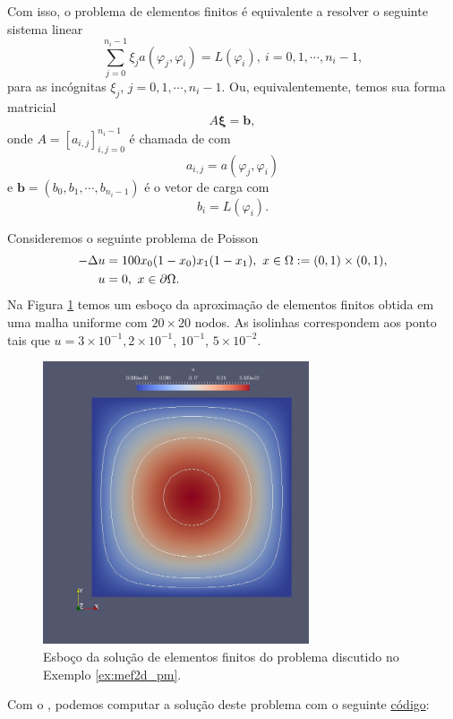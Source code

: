 Com isso, o problema de elementos finitos é equivalente a resolver o seguinte sistema linear
\begin{equation}
  \sum_{j=0}^{n_i-1}\xi_ja(\varphi_j,\varphi_i) = L(\varphi_i),~i=0, 1, \cdots, n_i-1,
\end{equation}
para as incógnitas $\xi_j$, $j=0, 1, \cdots, n_i-1$. Ou, equivalentemente, temos sua forma matricial
\begin{equation}
  A\pmb{\xi} = \pmb{b},
\end{equation}
onde $A = [a_{i,j}]_{i,j=0}^{n_i-1}$ é chamada de  com
\begin{equation}
  a_{i,j} = a(\varphi_j, \varphi_i)
\end{equation}
e $\pmb{b} = (b_0, b_1, \cdots, b_{n_i-1})$ é o vetor de carga com
\begin{equation}
  b_i = L(\varphi_i).
\end{equation}

\begin{ex}\label{ex:mef2d_pm}
  Consideremos o seguinte problema de Poisson
  \begin{align}
    -\Delta u &= 100x_0(1-x_0)x_1(1-x_1),~x\in\Omega:=(0, 1)\times (0, 1),\\
    u &= 0,~x\in\partial\Omega.
  \end{align}
  Na Figura \ref{fig:mef2d_pm} temos um esboço da aproximação de elementos finitos obtida em uma malha uniforme com $20\times 20$ nodos. As isolinhas correspondem aos ponto tais que $u=3\times 10^{-1}, 2\times 10^{-1}$, $10^{-1}$, $5\times 10^{-2}$.

  \begin{figure}[h!]
    \centering
    \includegraphics[width=0.7\textwidth]{./cap_mef2d/dados/ex_mef2d_pm/fig_mef2d_pm}
    \caption{Esboço da solução de elementos finitos do problema discutido no Exemplo \ref{ex:mef2d_pm}.}
    \label{fig:mef2d_pm}
  \end{figure}

\ifispython
Com o \fenics, podemos computar a solução deste problema com o seguinte \href{https://github.com/phkonzen/notas/blob/master/src/MetodoElementosFinitos/cap_mef2d/dados/ex_mef2d_pm/ex_mef2d_pm.py}{código}:

\fi
\end{ex}


